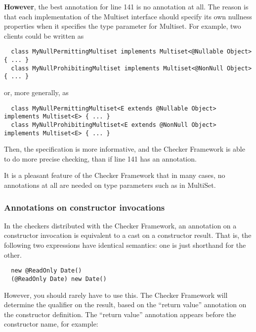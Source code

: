\textbf{However}, the best annotation for line 141 is no annotation at all.
The reason is that each implementation of the Multiset interface should
specify its own nullness properties when it specifies the type parameter
for Multiset.  For example, two clients could be written as

\begin{Verbatim}
  class MyNullPermittingMultiset implements Multiset<@Nullable Object> { ... }
  class MyNullProhibitingMultiset implements Multiset<@NonNull Object> { ... }
\end{Verbatim}

\noindent
or, more generally, as

\begin{Verbatim}
  class MyNullPermittingMultiset<E extends @Nullable Object> implements Multiset<E> { ... }
  class MyNullProhibitingMultiset<E extends @NonNull Object> implements Multiset<E> { ... }
\end{Verbatim}

Then, the specification is more informative, and the Checker Framework is
able to do more precise checking, than if line 141 has an annotation.

It is a pleasant feature of the Checker Framework that in many cases, no
annotations at all are needed on type parameters such as  in MultiSet.


\subsubsection{Annotations on constructor invocations\label{annotations-on-constructor-invocations}}


In the checkers distributed with the Checker Framework, an annotation on a
constructor invocation is equivalent to a cast on a constructor result.
That is, the following two expressions have identical semantics:  one is
just shorthand for the other.

\begin{Verbatim}
  new @ReadOnly Date()
  (@ReadOnly Date) new Date()
\end{Verbatim}

However, you should rarely have to use this.  The Checker Framework will
determine the qualifier on the result, based on the ``return value''
annotation on the constructor definition.  The ``return value'' annotation
appears before the constructor name, for example:

